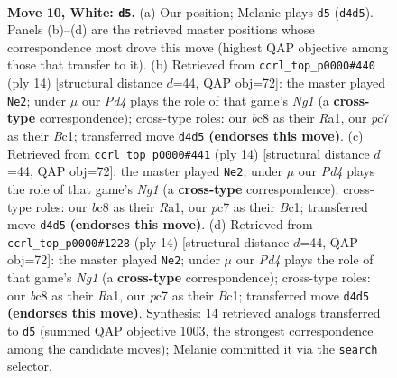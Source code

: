 \documentclass[11pt]{article}
\begin{document}
\clearpage

\begin{figure}[p]\centering
\begin{subfigure}{0.46\textwidth}\centering
\resizebox{\linewidth}{!}{%
\newchessgame
\chessboard[
  setfen={rnb1qrk1/ppp1pp1p/5bp1/8/2BPP3/B1P4N/P4PPP/R2QK2R w KQ - 7 10},
  showmover=false,
  pgfstyle=straightmove, color=movearrow, markmove={d4-d5}
]}
\caption{}
\end{subfigure}\hfill
\begin{subfigure}{0.46\textwidth}\centering
\resizebox{\linewidth}{!}{%
\newchessgame
\chessboard[
  setfen={rnbq1rk1/ppp1ppbp/6p1/8/2BPP3/2P5/P4PPP/R1BQK1NR w KQ - 3 8},
  showmover=false,
  pgfstyle=straightmove, color=movearrow, markmove={g1-e2}
]}
\caption{}
\end{subfigure}
\\[4pt]
\begin{subfigure}{0.46\textwidth}\centering
\resizebox{\linewidth}{!}{%
\newchessgame
\chessboard[
  setfen={rnbq1rk1/ppp1ppbp/6p1/8/2BPP3/2P5/P4PPP/R1BQK1NR w KQ - 3 8},
  showmover=false,
  pgfstyle=straightmove, color=movearrow, markmove={g1-e2}
]}
\caption{}
\end{subfigure}\hfill
\begin{subfigure}{0.46\textwidth}\centering
\resizebox{\linewidth}{!}{%
\newchessgame
\chessboard[
  setfen={rnbq1rk1/ppp1ppbp/6p1/8/2BPP3/2P5/P4PPP/R1BQK1NR w KQ - 3 8},
  showmover=false,
  pgfstyle=straightmove, color=movearrow, markmove={g1-e2}
]}
\caption{}
\end{subfigure}
\caption{\textbf{Move 10, White: \texttt{d5}.} (a) Our position; Melanie plays \texttt{d5} (\texttt{d4d5}). Panels (b)--(d) are the retrieved master positions whose correspondence most drove this move (highest QAP objective among those that transfer to it). (b) Retrieved from \texttt{ccrl\_top\_p0000\#440} (ply 14) [structural distance $d$=44, QAP obj=72]: the master played \texttt{Ne2}; under $\mu$ our \emph{Pd4} plays the role of that game's \emph{Ng1} (a \textbf{cross-type} correspondence); cross-type roles: our \emph{b}c8 as their \emph{R}a1, our \emph{p}c7 as their \emph{B}c1; transferred move \texttt{d4d5} \textbf{(endorses this move)}. (c) Retrieved from \texttt{ccrl\_top\_p0000\#441} (ply 14) [structural distance $d$=44, QAP obj=72]: the master played \texttt{Ne2}; under $\mu$ our \emph{Pd4} plays the role of that game's \emph{Ng1} (a \textbf{cross-type} correspondence); cross-type roles: our \emph{b}c8 as their \emph{R}a1, our \emph{p}c7 as their \emph{B}c1; transferred move \texttt{d4d5} \textbf{(endorses this move)}. (d) Retrieved from \texttt{ccrl\_top\_p0000\#1228} (ply 14) [structural distance $d$=44, QAP obj=72]: the master played \texttt{Ne2}; under $\mu$ our \emph{Pd4} plays the role of that game's \emph{Ng1} (a \textbf{cross-type} correspondence); cross-type roles: our \emph{b}c8 as their \emph{R}a1, our \emph{p}c7 as their \emph{B}c1; transferred move \texttt{d4d5} \textbf{(endorses this move)}. Synthesis: 14 retrieved analogs transferred to \texttt{d5} (summed QAP objective 1003, the strongest correspondence among the candidate moves); Melanie committed it via the \texttt{search} selector.}
\label{fig:thought-m18}
\end{figure}
\end{document}
